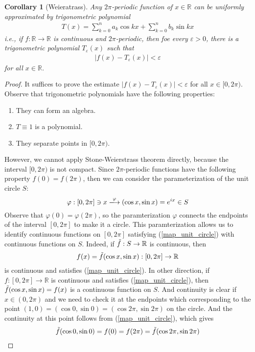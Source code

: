 \documentclass[12pt,leqno]{amsart}
\newtheorem{corollary}{Corollary}[theorem]
\theoremstyle{definition}
\numberwithin{equation}{subsection}
\begin{document}
\begin{corollary}[Weieratrass]
Any $2\pi$-periodic function of $x\in\mathbb{R}$ can be uniformly approximated by trigonometric polynomial
\begin{align*}
    T(x) = \sum^n_{k=0}a_k \cos kx + \sum^n_{k=0}b_k \sin kx
\end{align*}
i.e., if $f:\mathbb{R}\to\mathbb{R}$ is continuous and $2\pi$-periodic, then foe every $\varepsilon > 0$, there is a trigonometric polynomial $T_\varepsilon(x)$ such that
\begin{align*}
    |f(x) - T_\varepsilon(x)| < \varepsilon
\end{align*}
for all $x\in\mathbb{R}$.
\end{corollary}
\begin{proof}
It suffices to prove the estimate $|f(x) - T_\varepsilon(x)| < \varepsilon$ for all $x\in[0,2\pi)$. Observe that trigonometric polynomials have the following properties:
\begin{enumerate}
    \item They can form an algebra.
    \item $T\equiv 1$ is a polynomial.
    \item They separate points in $[0,2\pi)$.
\end{enumerate}

However, we cannot apply Stone-Weierstrass theorem directly, because the interval $[0,2\pi)$ is not compact. Since $2\pi$-periodic functions have the following property $f(0) = f(2\pi)$, then we can consider the parameterization of the unit circle $S$: 
\begin{equation}\label{map_unit_circle}
    \varphi: [0,2\pi]\ni x \xlongrightarrow{\varphi}(\cos x, \sin x) = e^{ix}\in S
\end{equation}
Observe that $\varphi(0) = \varphi(2\pi)$, so the paramterization $\varphi$ connects the endpoints of the interval $[0,2\pi]$ to make it a circle. This paramterization allows us to identify continuous functions on $[0,2\pi]$ satisfying (\ref{map_unit_circle}) with continuous functions on $S$. Indeed, if $\Tilde{f}:S\to\mathbb{R}$ is continuous, then
\begin{align*}
    f(x) = \Tilde{f}(\cos x,\sin x):[0,2\pi]\to\mathbb{R}
\end{align*}
is continuous and satisfies (\ref{map_unit_circle}). In other direction, if $f:[0,2\pi]\to\mathbb{R}$ is continuous and satisfies (\ref{map_unit_circle}), then $\Tilde{f}(\cos x,\sin x) = f(x)$ is a continuous function on $S$. And continuity is clear if $x\in(0,2\pi)$ and we need to check it at the endpoints which corresponding to the point $(1,0) = (\cos 0,\sin 0) = (\cos 2\pi,\sin 2\pi)$ on the circle. And the continuity at this point follows from (\ref{map_unit_circle}), which gives 
\begin{align*}
    \Tilde{f}(\cos 0,\sin 0) = f(0) = f(2\pi) = \Tilde{f}(\cos 2\pi,\sin 2\pi)
\end{align*}


\end{proof}
\end{document}
